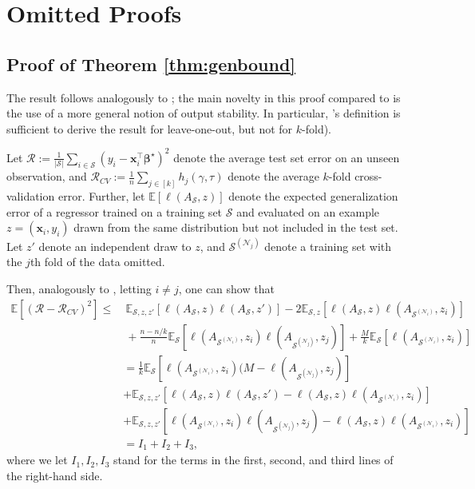 \documentclass[mnsc,nonblindrev]{informs3} %
\begin{document}
\FloatBarrier



\section{Omitted Proofs}
\subsection{Proof of Theorem \ref{thm:genbound}}\label{append.genboundproof}
The result follows analogously to \citep[Theorem 11]{bousquet2002stability}; the main novelty in this proof compared to \citep[Theorem 11]{bousquet2002stability} is the use of a more general notion of output stability. In particular, \citet{bousquet2002stability}'s definition is sufficient to derive the result for leave-one-out, but not for $k$-fold).

Let $\mathcal{R}:=\frac{1}{\vert \mathcal{S}\vert} \sum_{i \in \mathcal{S}} (y_i-\bm{x}_i^\top \bm{\beta}^\star)^2$ denote the average test set error on an unseen observation, and $\mathcal{R}_{CV}:=\frac{1}{n} \sum_{j \in [k]} h_j(\gamma, \tau)$ denote the average $k$-fold cross-validation error. Further, let $\mathbb{E}[\ell(A_{\mathcal{S}}, z)]$ denote the expected generalization error of a regressor trained on a training set $\mathcal{S}$ and evaluated on an example $z=(\bm{x}_i, y_i)$ drawn from the same distribution but not included in the test set. Let $z'$ denote an independent draw to $z$, and $\mathcal{S}^{(\mathcal{N}_j)}$ denote a training set with the $j$th fold of the data omitted.

Then, analogously to \citep[Lemma 9]{bousquet2002stability}, letting $i \neq j$, one can show that
\begin{align}
\mathbb{E}[(\mathcal{R}-\mathcal{R}_{CV})^2]\leq &\  \mathbb{E}_{\mathcal{S}, z, z'}[\ell(A_{\mathcal{S}}, z)\ell(A_{\mathcal{S}}, z')]-2\mathbb{E}_{\mathcal{S}, z}[\ell(A_{\mathcal{S}}, z)\ell(A_{\mathcal{S}^{(\mathcal{N}_i)}}, z_i)]\\
& \ + \frac{n-n/k}{n} \mathbb{E}_{\mathcal{S}}[\ell(A_{\mathcal{S}^{(\mathcal{N}_i)}}, z_i)\ell(A_{\mathcal{S}^{(\mathcal{N}_j)}}, z_j)]+\frac{M}{k}\mathbb{E}_{\mathcal{S}}[\ell(A_{\mathcal{S}^{(\mathcal{N}_i)}}, z_i)]\nonumber\\
& = \frac{1}{k}\mathbb{E}_{\mathcal{S}}[\ell(A_{\mathcal{S}^{(\mathcal{N}_i)}}, z_i)(M-\ell(A_{\mathcal{S}^{(\mathcal{N}_j)}}, z_j)]\\
& + \mathbb{E}_{\mathcal{S}, z, z'}[\ell(A_{\mathcal{S}}, z)\ell(A_{\mathcal{S}}, z')-\ell(A_{\mathcal{S}}, z)\ell(A_{\mathcal{S}^{(\mathcal{N}_i)}}, z_i)]\nonumber\\
& + \mathbb{E}_{\mathcal{S}, z, z'}[\ell(A_{\mathcal{S}^{(\mathcal{N}_i)}}, z_i)\ell(A_{\mathcal{S}^{(\mathcal{N}_j)}}, z_j)-\ell(A_{\mathcal{S}}, z)\ell(A_{\mathcal{S}^{(\mathcal{N}_i)}}, z_i)]\nonumber\\
& = I_1+I_2+I_3,\nonumber
\end{align}
where we let $I_1, I_2, I_3$ stand for the terms in the first, second, and third lines of the right-hand side.
\end{document}
